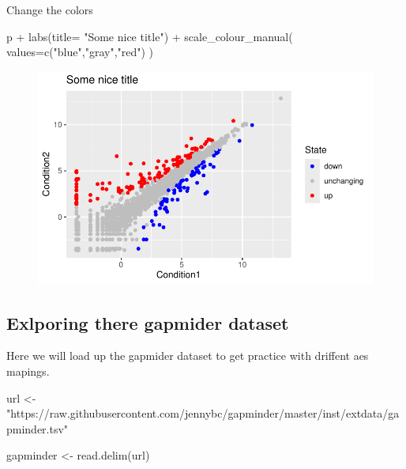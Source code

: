 \documentclass[
  letterpaper,
  DIV=11,
  numbers=noendperiod]{scrartcl}
\newenvironment{Shaded}{\begin{snugshade}}{\end{snugshade}}
\newcommand{\AttributeTok}[1]{\textcolor[rgb]{0.40,0.45,0.13}{#1}}
\newcommand{\FunctionTok}[1]{\textcolor[rgb]{0.28,0.35,0.67}{#1}}
\newcommand{\NormalTok}[1]{\textcolor[rgb]{0.00,0.23,0.31}{#1}}
\newcommand{\OtherTok}[1]{\textcolor[rgb]{0.00,0.23,0.31}{#1}}
\newcommand{\SpecialCharTok}[1]{\textcolor[rgb]{0.37,0.37,0.37}{#1}}
\newcommand{\StringTok}[1]{\textcolor[rgb]{0.13,0.47,0.30}{#1}}
\begin{document}
Change the colors

\begin{Shaded}
\begin{Highlighting}[]
\NormalTok{p }\SpecialCharTok{+} \FunctionTok{labs}\NormalTok{(}\AttributeTok{title=} \StringTok{"Some nice title"}\NormalTok{) }\SpecialCharTok{+} \FunctionTok{scale\_colour\_manual}\NormalTok{( }\AttributeTok{values=}\FunctionTok{c}\NormalTok{(}\StringTok{"blue"}\NormalTok{,}\StringTok{"gray"}\NormalTok{,}\StringTok{"red"}\NormalTok{) )}
\end{Highlighting}
\end{Shaded}

\begin{figure}[H]

{\centering \includegraphics{./-class05_files/figure-pdf/unnamed-chunk-14-1.pdf}

}

\end{figure}

\hypertarget{exlporing-there-gapmider-dataset}{%
\subsection{Exlporing there gapmider
dataset}\label{exlporing-there-gapmider-dataset}}

Here we will load up the gapmider dataset to get practice with driffent
aes mapings.

\begin{Shaded}
\begin{Highlighting}[]
\NormalTok{url }\OtherTok{\textless{}{-}} \StringTok{"https://raw.githubusercontent.com/jennybc/gapminder/master/inst/extdata/gapminder.tsv"}

\NormalTok{gapminder }\OtherTok{\textless{}{-}} \FunctionTok{read.delim}\NormalTok{(url)}
\end{Highlighting}
\end{Shaded}
\end{document}
